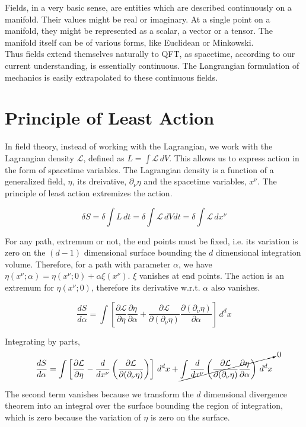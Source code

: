 Fields, in a very basic sense, are entities which are described continuously on a manifold. Their values might be real or imaginary. At a single point on a manifold, they might be represented as a scalar, a vector or a tensor. The manifold itself can be of various forms, like Euclidean or Minkowski. \\

\noindent Thus fields extend themselves naturally to QFT, as spacetime, according to our current understanding, is essentially continuous. The Langrangian formulation of mechanics is easily extrapolated to these continuous fields.

\section{Principle of Least Action}
In field theory, instead of working with the Lagrangian, we work with the Lagrangian density $\mathcal{L}$, defined as $L=\int\mathcal{L}\, dV$. This allows us to express action in the form of spacetime variables. The Lagrangian density is a function of a generalized field, $\eta$, its dreivative, $\partial_\nu\eta$ and the spacetime variables, $x^\nu$. The principle of least action extremizes the action.

$$\delta S=\delta\int L\, dt=\delta\int\mathcal{L}\, dVdt=\delta\int\mathcal{L}\, dx^\nu$$

\noindent For any path, extremum or not, the end points must be fixed, i.e. its variation is zero on the $(d-1)$ dimensional surface bounding the $d$ dimensional integration volume. Therefore, for a path with parameter $\alpha$, we have $\eta(x^\nu;\alpha)=\eta(x^\nu;0)+\alpha\xi(x^\nu)$. $\xi$ vanishes at end points. The action is an extremum for $\eta(x^\nu;0)$, therefore its derivative w.r.t. $\alpha$ also vanishes.

$$\frac{dS}{d\alpha}=\int \left[\frac{\partial\mathcal{L}}{\partial\eta}\frac{\partial\eta}{\partial\alpha}+\frac{\partial\mathcal{L}}{\partial(\partial_\nu\eta)}\frac{\partial(\partial_\nu\eta)}{\partial\alpha}\right]\, d^dx$$

\noindent Integrating by parts,
$$\frac{dS}{d\alpha}=\int \left[\frac{\partial\mathcal{L}}{\partial\eta}-\frac{d}{dx^\nu}\left(\frac{\partial\mathcal{L}}{\partial(\partial_\nu \eta)}\right) \right]\, d^dx + \cancelto{0}{\int\frac{d}{dx^\nu}\left(\frac{\partial\mathcal{L}}{\partial(\partial_\nu \eta)}\frac{\partial\eta}{\partial\alpha}\right)\, d^dx}$$

\noindent The second term vanishes because we transform the $d$ dimensional divergence theorem into an integral over the surface bounding the region of integration, which is zero because the variation of $\eta$ is zero on the surface.


